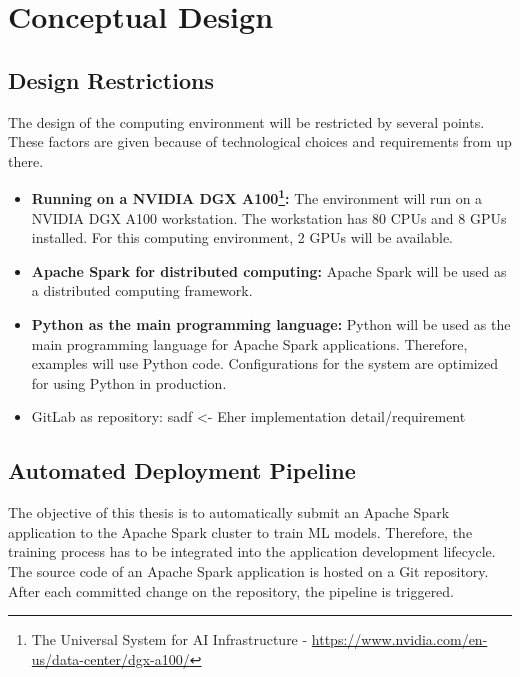 \chapter{Conceptual Design}
\label{chap:05_design}
%


\section{Design Restrictions}
\label{sec:05_restrictions}
The design of the computing environment will be restricted by several points. These factors are given because of technological choices and requirements from up there.

\begin{itemize}
\item \textbf{Running on a NVIDIA DGX A100\footnote{The Universal System for AI Infrastructure - \url{https://www.nvidia.com/en-us/data-center/dgx-a100/}}:} The environment will run on a NVIDIA DGX A100 workstation. The workstation has 80 CPUs and 8 GPUs installed. For this computing environment, 2 GPUs will be available.

\item \textbf{Apache Spark for distributed computing:} Apache Spark will be used as a distributed computing framework.

\item \textbf{Python as the main programming language:} Python will be used as the main programming language for Apache Spark applications. Therefore, examples will use Python code. Configurations for the system are optimized for using Python in production.

\item GitLab as repository: sadf <- Eher implementation detail/requirement
\end{itemize}

\section{Automated Deployment Pipeline}
The objective of this thesis is to automatically submit an Apache Spark application to the Apache Spark cluster to train ML models. Therefore, the training process has to be integrated into the application development lifecycle.
The source code of an Apache Spark application is hosted on a Git repository. After each committed change on the repository, the pipeline is triggered.


